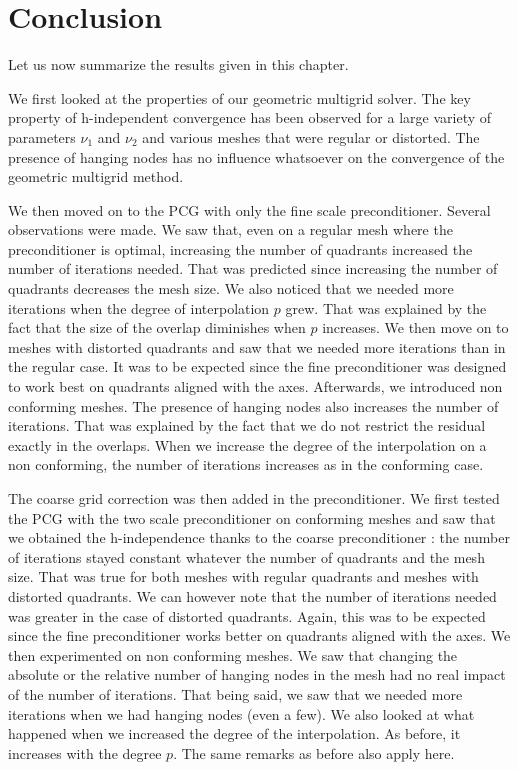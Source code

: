 \section{Conclusion}

Let us now summarize the results given in this chapter. 

We first looked at the properties of our geometric multigrid solver. The key property of h-independent convergence has been observed for a large variety of parameters $\nu_1$ and $\nu_2$ and various meshes that were regular or distorted. The presence of hanging nodes has no influence whatsoever on the convergence of the geometric multigrid method. 

We then moved on to the PCG with only the fine scale preconditioner. Several observations were made. We saw that, even on a regular mesh where the preconditioner is optimal, increasing the number of quadrants increased the number of iterations needed. That was predicted since increasing the number of quadrants decreases the mesh size. We also noticed that we needed more iterations when the degree of interpolation $p$ grew. That was explained by the fact that the size of the overlap diminishes when $p$ increases. We then move on to meshes with distorted quadrants and saw that we needed more iterations than in the regular case. It was to be expected since the fine preconditioner was designed to work best on quadrants aligned with the axes. Afterwards, we introduced non conforming meshes. The presence of hanging nodes also increases the number of iterations. That was explained by the fact that we do not restrict the residual exactly in the overlaps. When we increase the degree of the interpolation on a non conforming, the number of iterations increases as in the conforming case. 

The coarse grid correction was then added in the preconditioner. We first tested the PCG with the two scale preconditioner on conforming meshes and saw that we obtained the h-independence thanks to the coarse preconditioner : the number of iterations stayed constant whatever the number of quadrants and the mesh size. That was true for both meshes with regular quadrants and meshes with distorted quadrants. We can however note that the number of iterations needed was greater in the case of distorted quadrants. Again, this was to be expected since the fine preconditioner works better on quadrants aligned with the axes. We then experimented on non conforming meshes. We saw that changing the absolute or the relative number of hanging nodes in the mesh had no real impact of the number of iterations. That being said, we saw that we needed more iterations when we had hanging nodes (even a few). We also looked at what happened when we increased the degree of the interpolation. As before, it increases with the degree $p$. The same remarks as before also apply here. 

